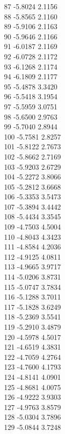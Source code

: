 \documentclass[11pt]{article}
\theoremstyle{definition}
\theoremstyle{plain}
\begin{document}
{87 -5.8024 2.1156\\
88 -5.8565 2.1160\\
89 -5.9106 2.1163\\
90 -5.9646 2.1166\\
91 -6.0187 2.1169\\
92 -6.0728 2.1172\\
93 -6.1268 2.1174\\
94 -6.1809 2.1177\\
95 -5.4878 3.3420\\
96 -5.5418 3.1954\\
97 -5.5959 3.0751\\
98 -5.6500 2.9763\\
99 -5.7040 2.8944\\
100 -5.7581 2.8257\\
101 -5.8122 2.7673\\
102 -5.8662 2.7169\\
103 -5.9203 2.6729\\
104 -5.2272 3.8066\\
105 -5.2812 3.6668\\
106 -5.3353 3.5473\\
107 -5.3894 3.4442\\
108 -5.4434 3.3545\\
109 -4.7503 4.5004\\
110 -4.8043 4.3423\\
111 -4.8584 4.2036\\
112 -4.9125 4.0811\\
113 -4.9665 3.9717\\
114 -5.0206 3.8731\\
115 -5.0747 3.7834\\
116 -5.1288 3.7011\\
117 -5.1828 3.6249\\
118 -5.2369 3.5541\\
119 -5.2910 3.4879\\
120 -4.5978 4.5017\\
121 -4.6519 4.3831\\
122 -4.7059 4.2764\\
123 -4.7600 4.1793\\
124 -4.8141 4.0901\\
125 -4.8681 4.0075\\
126 -4.9222 3.9303\\
127 -4.9763 3.8579\\
128 -5.0304 3.7896\\
129 -5.0844 3.7248\\
}
\end{document}
